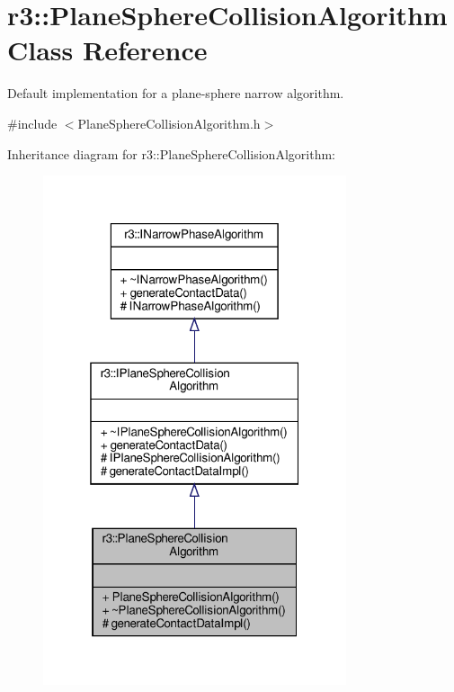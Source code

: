 \hypertarget{classr3_1_1_plane_sphere_collision_algorithm}{}\section{r3\+:\+:Plane\+Sphere\+Collision\+Algorithm Class Reference}
\label{classr3_1_1_plane_sphere_collision_algorithm}


Default implementation for a plane-\/sphere narrow algorithm.  




{\ttfamily \#include $<$Plane\+Sphere\+Collision\+Algorithm.\+h$>$}



Inheritance diagram for r3\+:\+:Plane\+Sphere\+Collision\+Algorithm\+:\nopagebreak
\begin{figure}[H]
\begin{center}
\leavevmode
\includegraphics[width=253pt]{classr3_1_1_plane_sphere_collision_algorithm__inherit__graph}
\end{center}
\end{figure}


